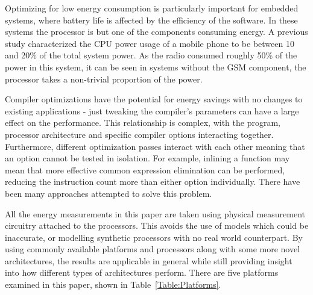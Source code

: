 \documentclass[twocolumn]{article}
\newcommand{\todo}[1]{\textbf{\textcolor{red}{#1}}}
\begin{document}
Optimizing for low energy consumption is particularly important for embedded systems, where battery life is affected by the efficiency of the software. In these systems the processor is but one of the components consuming energy. A previous study characterized the CPU power usage of a mobile phone to be between 10 and 20\% of the total system power\cite{SmartPhonePower}. As the radio consumed roughly 50\% of the power in this system, it can be seen in systems without the GSM component, the processor takes a non-trivial proportion of the power.


Compiler optimizations have the potential for energy savings with no changes to existing applications - just tweaking the compiler's parameters can have a large effect on the performance. This relationship is complex, with the program, processor architecture and specific compiler options interacting together. Furthermore, different optimization passes interact with each other meaning that an option cannot be tested in isolation. For example, inlining a function may mean that more effective common expression elimination can be performed, reducing the instruction count more than either option individually. There have been many approaches attempted to solve this problem\cite{Haneda2005, Lin2008, Triantafyllis}.

All the energy measurements in this paper are taken using physical measurement circuitry attached to the processors. This avoids the use of models which could be inaccurate, or modelling synthetic processors with no real world counterpart. By using commonly available platforms and processors along with some more novel architectures, the results are applicable in general while still providing insight into how different types of architectures perform. There are five platforms examined in this paper, shown in Table~\ref{Table:Platforms}.
\end{document}
